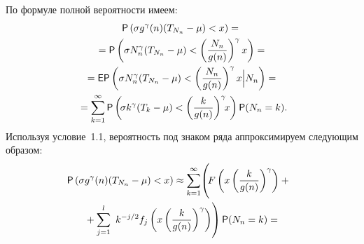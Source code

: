 \begin{multicols}{2}
По формуле полной вероятности имеем:
\begin{multline}
{{\sf P}}\left(\sigma g^\gamma(n)(T_{N_n} - \mu) < x\right)  ={}\\
{}=
{{\sf P}}\left(\sigma N_n^\gamma(T_{N_n} - \mu) <
\left(\displaystyle\frac{\displaystyle N_n\mathstrut}{\displaystyle g(n)\mathstrut}\right)^\gamma x\right)  ={}\\
{}
= {{\sf E}} {{\sf P}}\left(\sigma N_n^\gamma(T_{N_n} - \mu) <
\left(\displaystyle\frac{\displaystyle N_n\mathstrut}{\displaystyle g(n)\mathstrut}\right)^\gamma x \Big| N_n\right)  ={}\\
\!{}=
\sum\limits_{k=1}^{\infty} {{\sf P}}\left(\!\sigma k^\gamma(T_{k}  -  \mu) <
\left(\displaystyle\frac{\displaystyle k\mathstrut}{\displaystyle g(n)\mathstrut}\right)^\gamma\!\! x\right){{\sf P}}(N_n=k).\!\!
\label{e2.1-ben}
\end{multline}
Используя условие~1.1, вероятность под знаком ряда аппроксимируем
следующим образом:
\begin{multline*}
\!\!\!\!{\p}\left(\sigma g^\gamma(n)(T_{N_n} - \mu) < x\right) \approx
\sum\limits_{k=1}^{\infty} \!\left(\!
\vphantom{\sum\limits_{j=1}^l\
k^{-j/2}f_j\left(x\left(\fr{k}{g(n)}\right)^\gamma\right)}
F\left(x
\left(\fr{k}{g(n)}\right)^\gamma\right) + {}\right.\hspace*{-1.8927pt}\\
\left.{}+\sum\limits_{j=1}^l\
k^{-j/2}f_j\left(x\left(\fr{k}{g(n)}\right)^\gamma\right)\right)
{\p}(N_n=k) ={}
\end{multline*}


\end{multicols}

